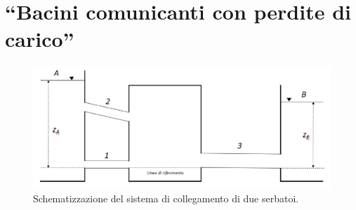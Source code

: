 \documentclass[oneside]{article}
\begin{document}
%
%
%

\section{``Bacini comunicanti con perdite di carico''}
\begin{figure}[htp]
   \centering
   \includegraphics[width=.8\textwidth]{Tanks.png}
   \caption{Schematizzazione del sistema di collegamento di due serbatoi.}
   \label{fig:fig1}
\end{figure}
\end{document}
